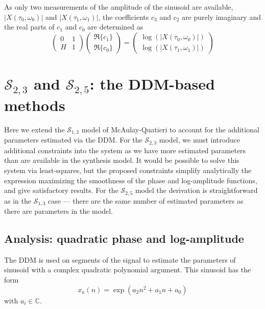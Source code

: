 As only two measurements of the amplitude of the sinusoid are available,
$|X(\tau_0,\omega_0)|$ and $|X(\tau_1,\omega_1)|$, the coefficients
$c_3$ and $c_2$ are purely imaginary and the real parts of $c_1$ and $c_0$ are
determined as
\[
    \begin{pmatrix}
        0 & 1 \\
        H & 1
    \end{pmatrix}
    \begin{pmatrix}
        \Re\{c_1\} \\
        \Re\{c_0\}
    \end{pmatrix}
    =
    \begin{pmatrix}
        \log(|X(\tau_0,\omega_0)|) \\
        \log(|X(\tau_1,\omega_1)|)
    \end{pmatrix}
\]

\section{$\mathscr{S}_{2,3}$ and $\mathscr{S}_{2,5}$: the DDM-based methods}

Here we extend the $\mathscr{S}_{1,3}$ model of McAulay-Quatieri to account for
the additional parameters estimated via the DDM. For the $\mathscr{S}_{2,3}$
model, we must introduce additional constraints into the system as we have more
estimated parameters than are available in the synthesis model. It would be
possible to solve this system via least-squares, but the proposed constraints
simplify analytically the expression maximizing the smoothness of the phase and
log-amplitude
functions, and give satisfactory results. For the $\mathscr{S}_{2,5}$ model the
derivation is straightforward as in the $\mathscr{S}_{1,3}$ case --- there are
the same number of estimated parameters as there are parameters in the model.

\subsection{Analysis: quadratic phase and log-amplitude \label{sec:s235analysis}}

The DDM is used on segments of the signal to estimate the parameters of sinusoid
with a complex quadratic polynomial argument. This sinusoid has the form
\begin{equation}
    \label{eq:quadraticphasepoly}
    x_{a}(n) = \exp \left(a_2 n^{2} + a_1 n + a_0 \right)
\end{equation}
with $a_{i} \in \mathbb{C}$.

